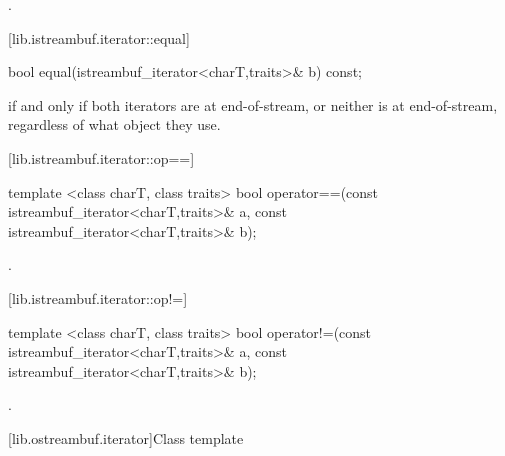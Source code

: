 \begin{itemdescr}
\pnum
\returns
{}.
\end{itemdescr}

[lib.istreambuf.iterator::equal]{}

%
\begin{itemdecl}
bool equal(istreambuf_iterator<charT,traits>& b) const;
\end{itemdecl}

\begin{itemdescr}
\pnum
\returns
{}
if and only if both iterators are at end-of-stream,
or neither is at end-of-stream, regardless of what
object they use.
\end{itemdescr}

[lib.istreambuf.iterator::op==]{}

%
\begin{itemdecl}
template <class charT, class traits>
  bool operator==(const istreambuf_iterator<charT,traits>& a,
                  const istreambuf_iterator<charT,traits>& b);
\end{itemdecl}

\begin{itemdescr}
\pnum
\returns
{}.
\end{itemdescr}

[lib.istreambuf.iterator::op!=]{}

%
\begin{itemdecl}
template <class charT, class traits>
  bool operator!=(const istreambuf_iterator<charT,traits>& a,
                  const istreambuf_iterator<charT,traits>& b);
\end{itemdecl}

\begin{itemdescr}
\pnum
\returns
{}.
\end{itemdescr}

[lib.ostreambuf.iterator]{Class template }

